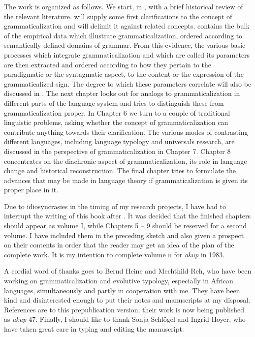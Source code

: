 \begin{refsection}
The work is organized as follows. We start, in , with a brief historical review of the relevant literature.  will supply some first clarifications to the concept of grammaticalization and will delimit it against related concepts.  contains the bulk of the empirical data which illustrate grammaticalization, ordered according to semantically defined domains of grammar. From this evidence, the various basic processes which integrate grammaticalization and which are called its parameters are then extracted and ordered according to how they pertain to the paradigmatic or the syntagmatic aspect, to the content or the expression of the grammaticalized sign. The degree to which these parameters correlate will also be discussed in . The next chapter looks out for analogs to grammaticalization in different parts of the language system and tries to distinguish these from grammaticalization proper. In Chapter 6 we turn to a couple of traditional linguistic problems, asking whether the concept of grammaticalization can contribute anything towards their clarification. The various modes of contrasting different languages, including language typology and universals research, are discussed in the perspective of grammaticalization in Chapter 7. Chapter 8 concentrates on the diachronic aspect of grammaticalization, its role in language change and historical reconstruction. The final chapter tries to formulate the advances that may be made in language theory if grammaticalization is given its proper place in it.

Due to idiosyncrasies in the timing of my research projects, I have had to interrupt the writing of this book after . It was decided that the finished chapters should appear as volume I, while Chapters 5 -- 9 should be reserved for a second volume. I have included them in the preceding sketch and also given a prospect on their contents in order that the reader may get an idea of the plan of the complete work. It is my intention to complete volume \textsc{ii} for \textit{akup} in 1983.

A cordial word of thanks goes to Bernd Heine and Mechthild Reh, who have been working on grammaticalization and evolutive typology, especially in African languages, simultaneously and partly in cooperation with me. They have been kind and disinterested enough to put their notes and manuscripts at my disposal. References are to this prepublication version; their work is now being published as \textit{akup} 47. Finally, I should like to thank Sonja Schlögel and Ingrid Hoyer, who have taken great care in typing and editing the manuscript.


\end{refsection}
